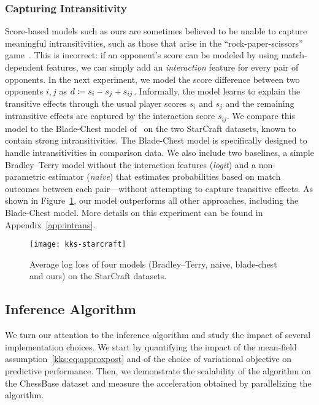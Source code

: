 \subsubsection{Capturing Intransitivity} \label{kks:sec:eval-intrans}
Score-based models such as ours are sometimes believed to be unable to capture meaningful intransitivities, such as those that arise in the ``rock-paper-scissors'' game~\citep{chen2016modeling}.
This is incorrect: if an opponent's score can be modeled by using match-dependent features, we can simply add an \emph{interaction} feature for every pair of opponents.
In the next experiment, we model the score difference between two opponents $i, j$ as $d \coloneqq s_i - s_j + s_{ij}$.
Informally, the model learns to explain the transitive effects through the usual player scores $s_i$ and $s_j$ and the remaining intransitive effects are captured by the interaction score $s_{ij}$.
We compare this model to the Blade-Chest model of~\citet{chen2016modeling} on the two StarCraft datasets, known to contain strong intransitivities.
The Blade-Chest model is specifically designed to handle intransitivities in comparison data.
We also include two baselines, a simple Bradley--Terry model without the interaction features (\emph{logit}) and a non-parametric estimator (\emph{naive}) that estimates probabilities based on match outcomes between each pair---without attempting to capture transitive effects.
As shown in Figure~\ref{kks:fig:starcraft}, our model outperforms all other approaches, including the Blade-Chest model.
More details on this experiment can be found in Appendix~\ref{app:intrans}.

\begin{figure}
	\centering
	\texttt{[image: kks-starcraft]}
	\caption{
		Average log loss of four models (Bradley--Terry, naive, blade-chest and ours) on the StarCraft datasets.}
	\label{kks:fig:starcraft}
\end{figure}


\subsection{Inference Algorithm}
\label{kks:sec:evalinf}
We turn our attention to the inference algorithm and study the impact of several implementation choices.
We start by quantifying the impact of the mean-field assumption~\eqref{kks:eq:approxpost} and of the choice of variational objective on predictive performance.
Then, we demonstrate the scalability of the algorithm on the ChessBase dataset and measure the acceleration obtained by parallelizing the algorithm.


